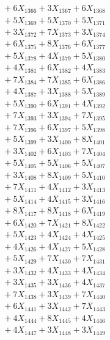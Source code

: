 \documentclass[a4paper,10pt]{article}
\begin{document}
{\begin{align}
&\;  + 6 X_{1366} + 3 X_{1367} + 6 X_{1368} \\[0.3ex]
&\;  + 5 X_{1369} + 5 X_{1370} + 5 X_{1371} \\[0.3ex]
&\;  + 3 X_{1372} + 7 X_{1373} + 3 X_{1374} \\[0.3ex]
&\;  + 6 X_{1375} + 8 X_{1376} + 6 X_{1377} \\[0.3ex]
&\;  + 5 X_{1378} + 4 X_{1379} + 5 X_{1380} \\[0.3ex]
&\;  + 4 X_{1381} + 6 X_{1382} + 4 X_{1383} \\[0.3ex]
&\;  + 7 X_{1384} + 7 X_{1385} + 6 X_{1386} \\[0.3ex]
&\;  + 4 X_{1387} + 3 X_{1388} + 5 X_{1389} \\[0.5ex]\allowbreak
&\;  + 5 X_{1390} + 6 X_{1391} + 4 X_{1392} \\[0.3ex]
&\;  + 7 X_{1393} + 3 X_{1394} + 7 X_{1395} \\[0.3ex]
&\;  + 7 X_{1396} + 6 X_{1397} + 5 X_{1398} \\[0.3ex]
&\;  + 5 X_{1399} + 3 X_{1400} + 8 X_{1401} \\[0.3ex]
&\;  + 3 X_{1402} + 6 X_{1403} + 7 X_{1404} \\[0.3ex]
&\;  + 5 X_{1405} + 5 X_{1406} + 5 X_{1407} \\[0.3ex]
&\;  + 3 X_{1408} + 8 X_{1409} + 5 X_{1410} \\[0.3ex]
&\;  + 7 X_{1411} + 4 X_{1412} + 3 X_{1413} \\[0.3ex]
&\;  + 5 X_{1414} + 4 X_{1415} + 3 X_{1416} \\[0.3ex]
&\;  + 8 X_{1417} + 8 X_{1418} + 6 X_{1419} \\[0.5ex]\allowbreak
&\;  + 6 X_{1420} + 7 X_{1421} + 8 X_{1422} \\[0.3ex]
&\;  + 5 X_{1423} + 4 X_{1424} + 4 X_{1425} \\[0.3ex]
&\;  + 4 X_{1426} + 4 X_{1427} + 5 X_{1428} \\[0.3ex]
&\;  + 5 X_{1429} + 7 X_{1430} + 7 X_{1431} \\[0.3ex]
&\;  + 3 X_{1432} + 4 X_{1433} + 4 X_{1434} \\[0.3ex]
&\;  + 3 X_{1435} + 3 X_{1436} + 4 X_{1437} \\[0.3ex]
&\;  + 7 X_{1438} + 3 X_{1439} + 7 X_{1440} \\[0.3ex]
&\;  + 6 X_{1441} + 3 X_{1442} + 7 X_{1443} \\[0.3ex]
&\;  + 4 X_{1444} + 8 X_{1445} + 4 X_{1446} \\[0.3ex]
&\;  + 4 X_{1447} + 3 X_{1448} + 3 X_{1449} \\[0.5ex]\allowbreak

\end{align}}
\end{document}
